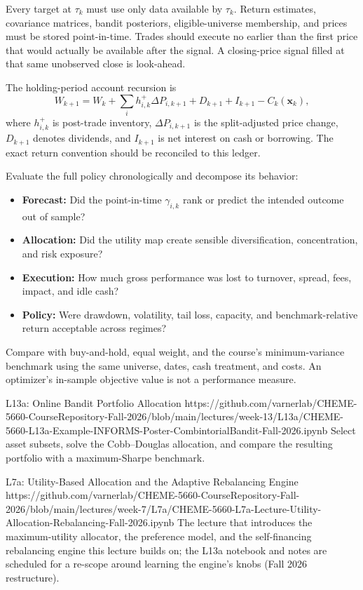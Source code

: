 \documentclass[11pt]{article}
\begin{document}
Every target at $\tau_k$ must use only data available by $\tau_k$. Return estimates, covariance matrices, bandit posteriors, eligible-universe membership, and prices must be stored point-in-time. Trades should execute no earlier than the first price that would actually be available after the signal. A closing-price signal filled at that same unobserved close is look-ahead.

The holding-period account recursion is
\begin{equation}
  \label{eq:wealth-recursion}
  W_{k+1}=W_k+\sum_i h_{i,k}^+\Delta P_{i,k+1}
  +D_{k+1}+I_{k+1}-C_k(\mathbf x_k),
\end{equation}
where $h_{i,k}^+$ is post-trade inventory, $\Delta P_{i,k+1}$ is the split-adjusted price change, $D_{k+1}$ denotes dividends, and $I_{k+1}$ is net interest on cash or borrowing. The exact return convention should be reconciled to this ledger.

Evaluate the full policy chronologically and decompose its behavior:
\begin{itemize}[leftmargin=1.3em,itemsep=2pt,topsep=2pt]
  \item \textbf{Forecast:} Did the point-in-time $\gamma_{i,k}$ rank or predict the intended outcome out of sample?
  \item \textbf{Allocation:} Did the utility map create sensible diversification, concentration, and risk exposure?
  \item \textbf{Execution:} How much gross performance was lost to turnover, spread, fees, impact, and idle cash?
  \item \textbf{Policy:} Were drawdown, volatility, tail loss, capacity, and benchmark-relative return acceptable across regimes?
\end{itemize}
Compare with buy-and-hold, equal weight, and the course's minimum-variance benchmark using the same universe, dates, cash treatment, and costs. An optimizer's in-sample objective value is not a performance measure.

\notebooklink
  {L13a: Online Bandit Portfolio Allocation}
  {https://github.com/varnerlab/CHEME-5660-CourseRepository-Fall-2026/blob/main/lectures/week-13/L13a/CHEME-5660-L13a-Example-INFORMS-Poster-CombintorialBandit-Fall-2026.ipynb}
  {Select asset subsets, solve the Cobb--Douglas allocation, and compare the resulting portfolio with a maximum-Sharpe benchmark.}

\notebooklink
  {L7a: Utility-Based Allocation and the Adaptive Rebalancing Engine}
  {https://github.com/varnerlab/CHEME-5660-CourseRepository-Fall-2026/blob/main/lectures/week-7/L7a/CHEME-5660-L7a-Lecture-Utility-Allocation-Rebalancing-Fall-2026.ipynb}
  {The lecture that introduces the maximum-utility allocator, the preference model, and the self-financing rebalancing engine this lecture builds on; the L13a notebook and notes are scheduled for a re-scope around learning the engine's knobs (Fall 2026 restructure).}
\end{document}
